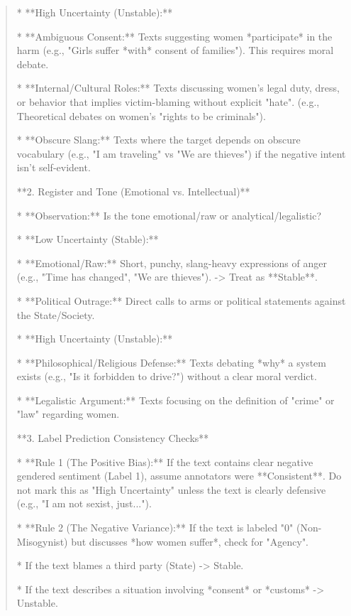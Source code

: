 \begin{quote}
*   **High Uncertainty (Unstable):**

    *   **Ambiguous Consent:** Texts suggesting women *participate* in the harm (e.g., "Girls suffer *with* consent of families"). This requires moral debate.

    *   **Internal/Cultural Roles:** Texts discussing women's legal duty, dress, or behavior that implies victim-blaming without explicit "hate". (e.g., Theoretical debates on women's "rights to be criminals").

    *   **Obscure Slang:** Texts where the target depends on obscure vocabulary (e.g., "I am traveling" vs "We are thieves") if the negative intent isn't self-evident.



**2. Register and Tone (Emotional vs. Intellectual)**

*   **Observation:** Is the tone emotional/raw or analytical/legalistic?

*   **Low Uncertainty (Stable):**

    *   **Emotional/Raw:** Short, punchy, slang-heavy expressions of anger (e.g., "Time has changed", "We are thieves"). -> Treat as **Stable**.

    *   **Political Outrage:** Direct calls to arms or political statements against the State/Society.

*   **High Uncertainty (Unstable):**

    *   **Philosophical/Religious Defense:** Texts debating *why* a system exists (e.g., "Is it forbidden to drive?") without a clear moral verdict.

    *   **Legalistic Argument:** Texts focusing on the definition of "crime" or "law" regarding women.



**3. Label Prediction Consistency Checks**

*   **Rule 1 (The Positive Bias):** If the text contains clear negative gendered sentiment (Label 1), assume annotators were **Consistent**. Do not mark this as "High Uncertainty" unless the text is clearly defensive (e.g., "I am not sexist, just...").

*   **Rule 2 (The Negative Variance):** If the text is labeled "0" (Non-Misogynist) but discusses *how women suffer*, check for "Agency".

    *   If the text blames a third party (State) -> Stable.

    *   If the text describes a situation involving *consent* or *customs* -> Unstable.




\end{quote}
